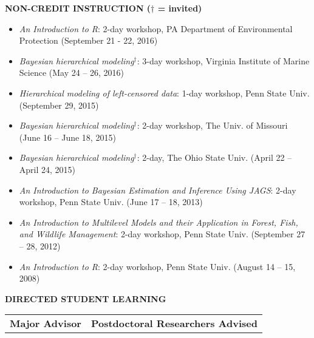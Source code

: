 \documentclass[10pt]{article}
\begin{document}
\begin{flushleft}
\vspace{8pt}
\centerline {\bf{NON-CREDIT INSTRUCTION ({\small $\dagger$ = invited})}}
\vspace{5pt}
\begin{itemize}
\item \emph{An Introduction to R}: 2-day workshop, PA Department of Environmental Protection (September 21 - 22, 2016)\\
\item \emph{Bayesian hierarchical modeling}$^\dagger$: 3-day workshop, Virginia Institute of Marine Science (May 24 -- 26, 2016)\\
\item \emph{Hierarchical modeling of left-censored data}: 1-day workshop, Penn State Univ. (September 29, 2015)
\item \emph{Bayesian hierarchical modeling}$^\dagger$: 2-day workshop, The Univ. of Missouri (June 16 -- June 18, 2015)\\
\item \emph{Bayesian hierarchical modeling}$^\dagger$: 2-day, The Ohio State Univ. (April 22 --  April 24, 2015)\\
\item \emph{An Introduction to Bayesian Estimation and Inference Using JAGS}: 2-day workshop, Penn State Univ. (June 17 -- 18, 2013)\\
\item \emph{An Introduction to Multilevel Models and their Application in Forest, Fish, and Wildlife Management}: 2-day workshop, Penn State Univ. (September 27 -- 28, 2012)\\
\item \emph{An Introduction to R}: 2-day workshop, Penn State Univ. (August 14 -- 15, 2008)\\

\end{itemize}

\vspace{8pt}


\centerline {\bf{DIRECTED STUDENT LEARNING}}
\vspace{5pt}
\begin{tabularx}{\textwidth}{ XX }

\textbf{Major Advisor} & \textbf{Postdoctoral Researchers Advised} \\


\end{tabularx}
\end{flushleft}
\end{document}
